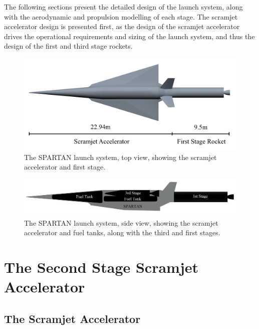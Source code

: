  The following sections present the detailed design of the launch system, along with the aerodynamic and propulsion modelling of each stage.
The scramjet accelerator design is presented first, as the design of the scramjet accelerator drives the operational requirements and sizing of the launch system, and thus the design of the first and third stage rockets. 


\begin{figure}[ht]
	\centering
	\includegraphics[width=0.7\linewidth]{figures/3_vehicle_design/NoInternal}
	\caption{The SPARTAN launch system, top view, showing the scramjet accelerator and first stage. }
	\label{fig:NoInternal}
\end{figure}

\begin{figure}[ht]
	\centering
	\includegraphics[width=0.7\linewidth]{figures/3_vehicle_design/INTERNALS}
	\caption{The SPARTAN launch system, side view, showing the scramjet accelerator and fuel tanks, along with the third and first stages. }
	\label{fig:INTERNALS}
\end{figure}









	
	
	\section{The Second Stage Scramjet Accelerator}\label{sec:SPARTAN}
 
		\subsection{The Scramjet Accelerator}
		
